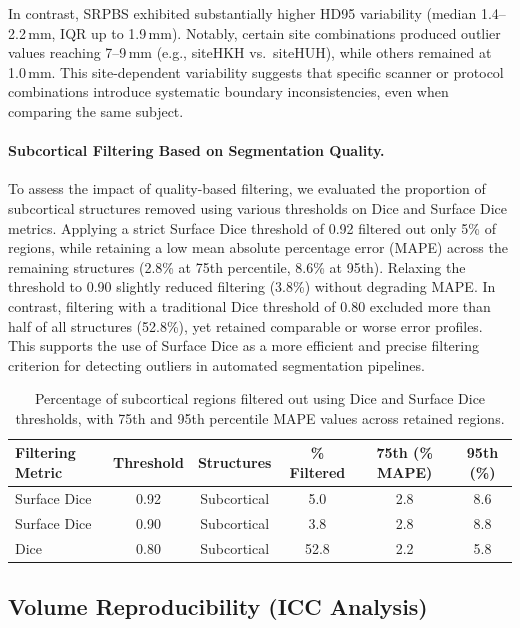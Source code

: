 \documentclass{midl} %
\begin{document}
In contrast, SRPBS exhibited substantially higher HD95 variability (median 1.4--2.2\,mm, IQR up to 1.9\,mm). Notably, certain site combinations produced outlier values reaching 7--9\,mm (e.g., siteHKH vs.\ siteHUH), while others remained at 1.0\,mm. This site-dependent variability suggests that specific scanner or protocol combinations introduce systematic boundary inconsistencies, even when comparing the same subject. 

\paragraph{Subcortical Filtering Based on Segmentation Quality.} 
To assess the impact of quality-based filtering, we evaluated the proportion of subcortical structures removed using various thresholds on Dice and Surface Dice metrics. Applying a strict Surface Dice threshold of 0.92 filtered out only 5\% of regions, while retaining a low mean absolute percentage error (MAPE) across the remaining structures (2.8\% at 75th percentile, 8.6\% at 95th). Relaxing the threshold to 0.90 slightly reduced filtering (3.8\%) without degrading MAPE. In contrast, filtering with a traditional Dice threshold of 0.80 excluded more than half of all structures (52.8\%), yet retained comparable or worse error profiles. This supports the use of Surface Dice as a more efficient and precise filtering criterion for detecting outliers in automated segmentation pipelines.


       \begin{table}[h]
        \centering
        \caption{Percentage of subcortical regions filtered out using Dice and Surface Dice thresholds, with 75th and 95th percentile MAPE values across retained regions.}
        \label{tab:filtering_subcortical}
        \begin{tabular}{lccccc}
        Filtering Metric & Threshold & Structures & \% Filtered & 75th (\% MAPE) & 95th (\%) \\
        \hline
        Surface Dice & 0.92 & Subcortical & 5.0 & 2.8 & 8.6 \\
        Surface Dice & 0.90 & Subcortical & 3.8 & 2.8 & 8.8 \\
        Dice         & 0.80 & Subcortical & 52.8 & 2.2 & 5.8 \\
        \end{tabular}
        \end{table}

\subsection{Volume Reproducibility (ICC Analysis)}
\end{document}
